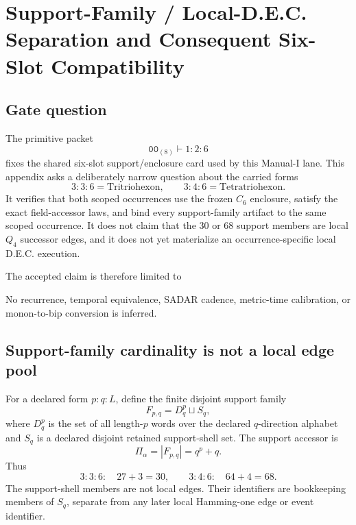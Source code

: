 \section{Support-Family / Local-D.E.C. Separation and Consequent Six-Slot Compatibility}
\label{app:manual1-consequent-six-slot-compatibility}

\subsection{Gate question}

The primitive packet
\[
\mathtt{00}_{(8)}\vdash 1{:}2{:}6
\]
fixes the shared six-slot support/enclosure card used by this Manual-I lane.
This appendix asks a deliberately narrow question about the carried forms
\[
3{:}3{:}6=\text{Tritriohexon},
\qquad
3{:}4{:}6=\text{Tetratriohexon}.
\]
It verifies that both scoped occurrences use the frozen \(C_6\) enclosure,
satisfy the exact field-accessor laws, and bind every support-family artifact
to the same scoped occurrence.  It does not claim that the \(30\) or \(68\)
support members are local \(Q_4\) successor edges, and it does not yet
materialize an occurrence-specific local D.E.C. execution.

The accepted claim is therefore limited to
\begin{center}
\end{center}
No recurrence, temporal equivalence, SADAR cadence, metric-time calibration,
or monon-to-bip conversion is inferred.

\subsection{Support-family cardinality is not a local edge pool}

For a declared form \(p{:}q{:}L\), define the finite disjoint support family
\[
F_{p,q}=D_q^p\sqcup S_q,
\]
where \(D_q^p\) is the set of all length-\(p\) words over the declared
\(q\)-direction alphabet and \(S_q\) is a declared disjoint retained
support-shell set.  The support accessor is
\[
\Pi_\alpha=|F_{p,q}|=q^p+q.
\]
Thus
\[
3{:}3{:}6:\quad 27+3=30,
\qquad
3{:}4{:}6:\quad 64+4=68.
\]
The support-shell members are not local edges.  Their identifiers are
bookkeeping members of \(S_q\), separate from any later local Hamming-one
edge or event identifier.

